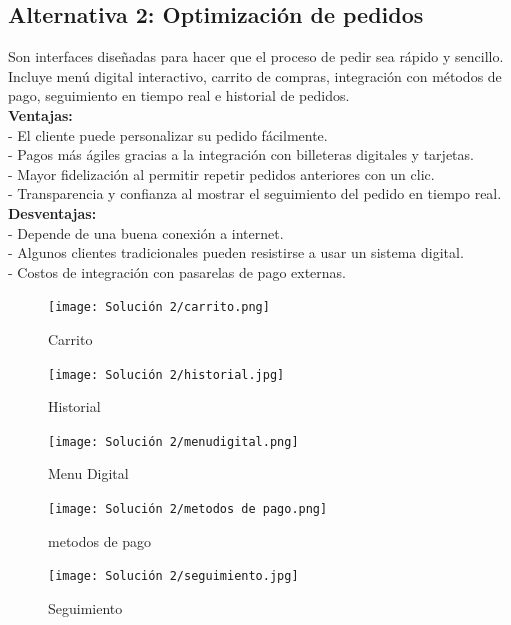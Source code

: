 \documentclass{article}
\begin{document}
\begin{doublespace}
    \subsection{Alternativa 2: Optimización de pedidos}

    \noindent Son interfaces diseñadas para hacer que el proceso de pedir sea rápido y sencillo. Incluye menú digital interactivo, carrito de compras, integración con métodos de pago, seguimiento en tiempo real e historial de pedidos.\\
    \textbf{Ventajas:}\\
    - El cliente puede personalizar su pedido fácilmente.\\
    - Pagos más ágiles gracias a la integración con billeteras digitales y tarjetas.\\
    - Mayor fidelización al permitir repetir pedidos anteriores con un clic.\\
    - Transparencia y confianza al mostrar el seguimiento del pedido en tiempo real.\\
    \textbf{Desventajas:}\\
    - Depende de una buena conexión a internet.\\
    - Algunos clientes tradicionales pueden resistirse a usar un sistema digital.\\
    - Costos de integración con pasarelas de pago externas.\\

    \begin{figure}[H]
        \centering
        \vspace*{1cm}
        \texttt{[image: Solución 2/carrito.png]}
        \caption{Carrito}
        \label{fig:Carrito}
    \end{figure}
    \begin{figure}[H]
        \centering
        \vspace*{1cm}
        \texttt{[image: Solución 2/historial.jpg]}
        \caption{Historial}
        \label{fig:Historial}
    \end{figure}
    \begin{figure}[H]
        \centering
        \vspace*{1cm}
        \texttt{[image: Solución 2/menudigital.png]}
        \caption{Menu Digital}
        \label{fig:Menu-Digital}
    \end{figure}
    \begin{figure}[H]
        \centering
        \vspace*{1cm}
        \texttt{[image: Solución 2/metodos de pago.png]}
        \caption{metodos de pago}
        \label{fig:Metodos-de-pago}
    \end{figure}
    \begin{figure}[H]
        \centering
        \vspace*{1cm}
        \texttt{[image: Solución 2/seguimiento.jpg]}
        \caption{Seguimiento}
        \label{fig:Seguimiento}
    \end{figure}
    

\end{doublespace}
\end{document}
